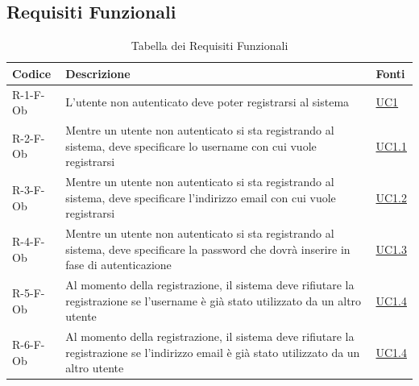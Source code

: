 \documentclass[a4paper, 11pt]{article}
\renewcommand{\arraystretch}{1.4} %
\begin{document}
\subsection{Requisiti Funzionali}
\renewcommand{\arraystretch}{1.5}
\begin{longtable}[c]{ >{\centering\arraybackslash}m{2.5cm} >{\centering\arraybackslash}m{8.3cm} >{\centering\arraybackslash}m{3.5cm} }
    \caption{Tabella dei Requisiti Funzionali} \\
    \rowcolor{AccentDark}
    \color{white}\textbf{Codice} & \color{white}\textbf{Descrizione} & \color{white}\textbf{Fonti} \\
    \endhead

    R-1-F-Ob & L'utente non autenticato deve poter registrarsi al sistema & \hyperref[UC1]{UC1} \\
    R-2-F-Ob & Mentre un utente non autenticato si sta registrando al sistema, deve specificare lo username con cui vuole registrarsi & \hyperref[UC1.1]{UC1.1}\\
    R-3-F-Ob & Mentre un utente non autenticato si sta registrando al sistema, deve specificare l'indirizzo email con cui vuole registrarsi & \hyperref[UC1.2]{UC1.2}\\
    R-4-F-Ob & Mentre un utente non autenticato si sta registrando al sistema, deve specificare la password che dovrà inserire in fase di autenticazione & \hyperref[UC1.3]{UC1.3}\\
    R-5-F-Ob & Al momento della registrazione, il sistema deve rifiutare la registrazione se l'username è già stato utilizzato da un altro utente & \hyperref[UC1.4]{UC1.4}\\
    R-6-F-Ob & Al momento della registrazione, il sistema deve rifiutare la registrazione se l'indirizzo email è già stato utilizzato da un altro utente & \hyperref[UC1.4]{UC1.4}\\


\end{longtable}
\end{document}
